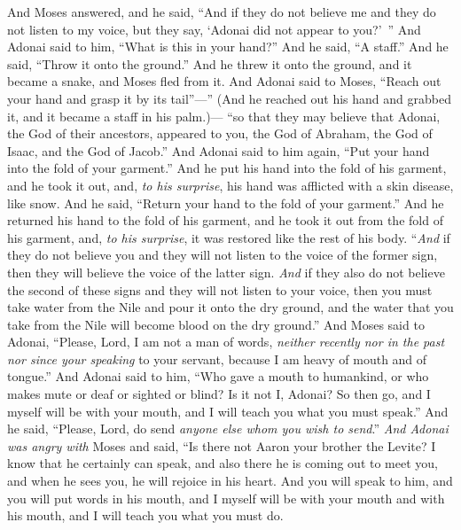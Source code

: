 \begin{biblechapter} %
 And Moses answered, and he said, “And if they do not believe me and they do not listen to my voice, but they say, ‘Adonai did not appear to you?’ ”
\verse And Adonai said to him, “What is this in your hand?” And he said, “A staff.”
\verse And he said, “Throw it onto the ground.” And he threw it onto the ground, and it became a snake, and Moses fled from it.
\verse And Adonai said to Moses, “Reach out your hand and grasp it by its tail”—” (And he reached out his hand and grabbed it, and it became a staff in his palm.)—
\verse “so that they may believe that Adonai, the God of their ancestors, appeared to you, the God of Abraham, the God of Isaac, and the God of Jacob.”
\verse And Adonai said to him again, “Put your hand into the fold of your garment.” And he put his hand into the fold of his garment, and he took it out, and, \textit{to his surprise}, his hand was afflicted with a skin disease, like snow.
\verse And he said, “Return your hand to the fold of your garment.” And he returned his hand to the fold of his garment, and he took it out from the fold of his garment, and, \textit{to his surprise}, it was restored like the rest of his body.
\verse “\textit{And} if they do not believe you and they will not listen to the voice of the former sign, then they will believe the voice of the latter sign.
\verse \textit{And} if they also do not believe the second of these signs and they will not listen to your voice, then you must take water from the Nile and pour it onto the dry ground, and the water that you take from the Nile will become blood on the dry ground.”
\verse And Moses said to Adonai, “Please, Lord, I am not a man of words, \textit{neither recently nor in the past nor since your speaking} to your servant, because I am heavy of mouth and of tongue.”
\verse And Adonai said to him, “Who gave a mouth to humankind, or who makes mute or deaf or sighted or blind? Is it not I, Adonai?
\verse So then go, and I myself will be with your mouth, and I will teach you what you must speak.”
\verse And he said, “Please, Lord, do send \textit{anyone else whom you wish to send}.”
\verse \textit{And Adonai was angry with} Moses and said, “Is there not Aaron your brother the Levite? I know that he certainly can speak, and also there he is coming out to meet you, and when he sees you, he will rejoice in his heart.
\verse And you will speak to him, and you will put words in his mouth, and I myself will be with your mouth and with his mouth, and I will teach you what you must do.

\end{biblechapter}
